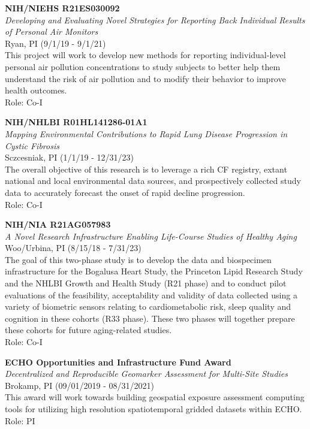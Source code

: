 \textbf{NIH/NIEHS R21ES030092}\\
\emph{Developing and Evaluating Novel Strategies for Reporting Back
Individual Results of Personal Air Monitors}\\
Ryan, PI (9/1/19 - 9/1/21)\\
This project will work to develop new methods for reporting
individual-level personal air pollution concentrations to study subjects
to better help them understand the risk of air pollution and to modify
their behavior to improve health outcomes.\\
Role: Co-I

\textbf{NIH/NHLBI R01HL141286-01A1}\\
\emph{Mapping Environmental Contributions to Rapid Lung Disease
Progression in Cystic Fibrosis}\\
Sczcesniak, PI (1/1/19 - 12/31/23)\\
The overall objective of this research is to leverage a rich CF
registry, extant national and local environmental data sources, and
prospectively collected study data to accurately forecast the onset of
rapid decline progression.\\
Role: Co-I

\textbf{NIH/NIA R21AG057983}\\
\emph{A Novel Research Infrastructure Enabling Life-Course Studies of
Healthy Aging}\\
Woo/Urbina, PI (8/15/18 - 7/31/23)\\
The goal of this two-phase study is to develop the data and biospecimen
infrastructure for the Bogalusa Heart Study, the Princeton Lipid
Research Study and the NHLBI Growth and Health Study (R21 phase) and to
conduct pilot evaluations of the feasibility, acceptability and validity
of data collected using a variety of biometric sensors relating to
cardiometabolic risk, sleep quality and cognition in these cohorts (R33
phase). These two phases will together prepare these cohorts for future
aging-related studies.\\
Role: Co-I

\textbf{ECHO Opportunities and Infrastructure Fund Award}\\
\emph{Decentralized and Reproducible Geomarker Assessment for Multi-Site
Studies}\\
Brokamp, PI (09/01/2019 - 08/31/2021)\\
This award will work towards building geospatial exposure assessment
computing tools for utilizing high resolution spatiotemporal gridded
datasets within ECHO.\\
Role: PI


